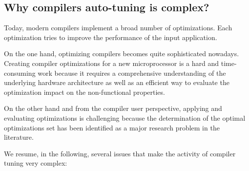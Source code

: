  
 
 

\subsection{Why compilers auto-tuning is complex?}
\label{sec:Why compilers auto-tuning is complex?}
Today, modern compilers implement a broad number of optimizations. Each optimization tries to improve the performance of the input application.

On the one hand, optimizing compilers becomes quite sophisticated nowadays. Creating compiler optimizations for a new microprocessor is a hard and time-consuming work because it requires a comprehensive understanding of the underlying hardware architecture as well as an efficient way to evaluate the optimization impact on the non-functional properties. 

On the other hand and from the compiler user perspective, applying and evaluating optimizations is challenging because the determination of the optimal optimizations set has been identified as a major research problem in the literature\cite{knijnenburg2002iterative}.

We resume, in the following, several issues that make the activity of compiler tuning very complex:

